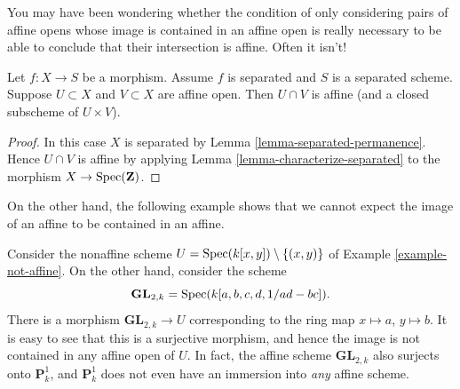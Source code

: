 \noindent
You may have been wondering whether the condition
of only considering pairs of affine opens whose image is contained
in an affine open is really necessary to be able to conclude
that their intersection is affine. Often it isn't!

\begin{lemma}
\label{lemma-curiosity}
Let $f : X \to S$ be a morphism.
Assume $f$ is separated and $S$ is a separated scheme.
Suppose $U \subset X$ and $V \subset X$ are affine open.
Then $U \cap V$ is affine (and a closed subscheme of $U \times V$).
\end{lemma}

\begin{proof}
In this case $X$ is separated by Lemma \ref{lemma-separated-permanence}.
Hence $U \cap V$ is affine by
applying Lemma \ref{lemma-characterize-separated} to the
morphism $X \to \mathop{\mathrm{Spec}}(\mathbf{Z})$.
\end{proof}

\noindent
On the other hand, the following example shows that we cannot
expect the image of an affine to be contained in an affine.

\begin{example}
\label{example-image-affine-projective}
Consider the nonaffine scheme
$U = \mathop{\mathrm{Spec}}(k[x, y]) \setminus \{(x, y)\}$ of
Example \ref{example-not-affine}. On the other hand, consider the
scheme
$$
\mathbf{GL}_{2, k} = \mathop{\mathrm{Spec}}(k[a, b, c, d, 1/ad - bc]).
$$
There is a morphism $\mathbf{GL}_{2, k} \to U$ corresponding
to the ring map $x \mapsto a$, $y \mapsto b$. It is easy to see that
this is a surjective morphism, and hence the image is not contained
in any affine open of $U$. In fact, the affine scheme
$\mathbf{GL}_{2, k}$ also surjects onto $\mathbf{P}^1_k$, and
$\mathbf{P}^1_k$ does not even have an immersion into {\it any} affine scheme.
\end{example}

